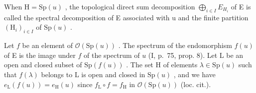 When \(\mathrm{H} = \mathrm{Sp}(u)\) , the topological direct sum decomposition \(\bigoplus_{i \in I} E_{H_i}\) of E is called the spectral decomposition of E associated with u and the finite partition \((\mathrm{H}_i)_{i \in I}\) of \(\mathrm{Sp}(u)\) .

Let \(f\) be an element of \(\mathcal{O}(\mathrm{Sp}(u))\) . The spectrum of the endomorphism \(f(u)\) of E is the image under \(f\) of the spectrum of \(u\) (I, p.~75, prop. 8). Let L be an open and closed subset of \(\mathrm{Sp}(f(u))\) . The set H of elements \(\lambda \in \mathrm{Sp}(u)\) such that \(f(\lambda)\) belongs to L is open and closed in \(\mathrm{Sp}(u)\) , and we have \(e_{\mathrm{L}}(f(u)) = e_{\mathrm{H}}(u)\) since \(f_{\mathrm{L}} \circ f = f_{\mathrm{H}}\) in \(\mathcal{O}(\mathrm{Sp}(u))\) (loc. cit.).

